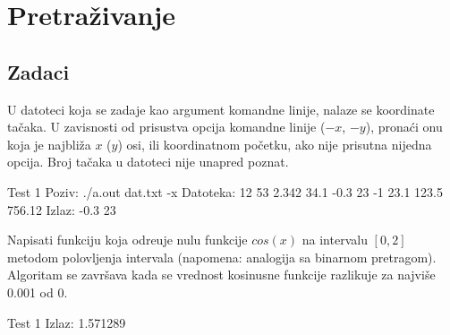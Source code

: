 
\chapter{Pretraživanje}

\section{Zadaci}

\begin{Exercise}[label=401]
  U datoteci koja se zadaje kao argument komandne linije, nalaze se
  koordinate ta\v caka. U zavisnosti od prisustva opcija komandne
  linije ($-x$, $-y$), prona\' ci onu koja je najbli\v za $x$ ($y$)
  osi, ili koordinatnom po\v cetku, ako nije prisutna nijedna
  opcija. Broj ta\v caka u datoteci nije unapred poznat.
  
  \begin{miditest}
    \begin{test}{Test 1}
      Poziv: ./a.out dat.txt -x
      Datoteka:
      12 53
      2.342 34.1
      -0.3 23
      -1 23.1
      123.5 756.12
      Izlaz: -0.3 23
    \end{test}
  \end{miditest}
  
\end{Exercise}

\begin{Answer}[ref=401]
\end{Answer}
\begin{Exercise}[label=402]
  Napisati funkciju koja odre\dj uje nulu funkcije $cos(x)$ na intervalu
  $[0,2]$ metodom polovljenja intervala (napomena: analogija sa binarnom
  pretragom). Algoritam se zavr\v sava kada se vrednost kosinusne
  funkcije razlikuje za najvi\v se 0.001 od 0.
  
  \begin{minitest}
    \begin{test}{Test 1}
      Izlaz:
      1.571289
    \end{test}
  \end{minitest}
  
\end{Exercise}

